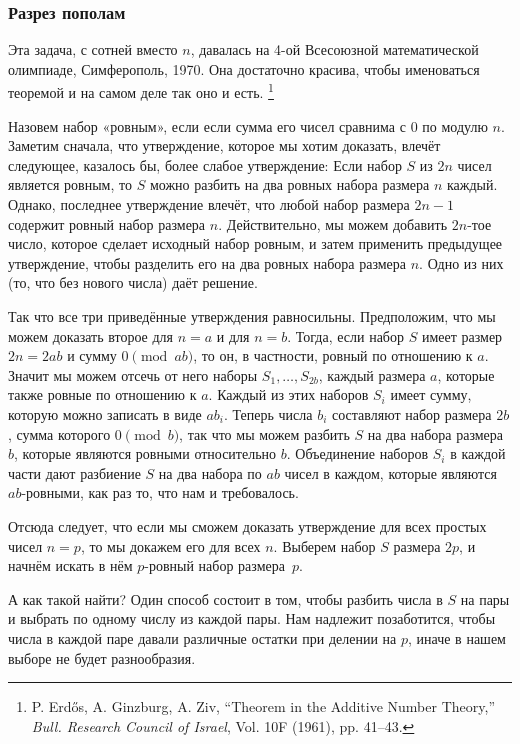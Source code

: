 \subsubsection*{Разрез пополам}

Эта задача, с сотней вместо $n$, давалась на 4-ой Всесоюзной математической олимпиаде, Симферополь, 1970.
Она достаточно красива, чтобы именоваться теоремой и на самом деле так оно и есть.%
\footnote{P. Erd\H{o}s, A. Ginzburg, A. Ziv, ``Theorem in the Additive Number Theory,'' \emph{Bull. Research Council of Israel}, Vol. 10F (1961), pp. 41--43.}

Назовем набор «ровным», если если сумма его чисел сравнима с $0$ по модулю $n$.
Заметим сначала, что утверждение, которое мы хотим доказать, влечёт следующее, казалось бы, более слабое утверждение: 
Если набор $S$ из $2n$ чисел является ровным, то $S$ можно разбить на два ровных набора размера $n$ каждый.
Однако, последнее утверждение влечёт, что любой набор размера $2n-1$ содержит ровный набор размера $n$.
Действительно, мы можем добавить $2n$-тое число, которое сделает исходный набор ровным, и затем применить предыдущее утверждение, чтобы разделить его на два ровных набора размера $n$. 
Одно из них (то, что без нового числа) даёт решение.

Так что все три приведённые утверждения равносильны.
Предположим, что мы можем доказать второе для $n = a$ и для $n = b$.
Тогда, если набор $S$ имеет размер $2n = 2ab$ и сумму $0 \pmod {ab}$, то он, в частности, ровный по отношению к $a$. 
Значит мы можем отсечь от него наборы $S_1,\dots,S_{2b}$, каждый размера $a$, которые также ровные по отношению к $a$.
Каждый из этих наборов $S_i$ имеет сумму, которую можно записать в виде $ab_i$.
Теперь числа $b_i$ составляют набор размера $2b$, сумма которого $0 \pmod b$, так что мы можем разбить $S$ на два набора размера $b$, которые являются ровными относительно $b$.
Объединение наборов $S_i$ в каждой части дают разбиение $S$ на два набора по $ab$ чисел в каждом, которые являются $ab$-ровными, как раз то, что нам и требовалось.

Отсюда следует, что если мы сможем доказать утверждение для всех простых чисел $n=p$, то мы докажем его для всех $n$.
Выберем набор $S$ размера $2p$, и начнём искать в нём $p$-ровный набор размера~$p$.

А как такой найти?
Один способ состоит в том, чтобы разбить числа в $S$ на пары и выбрать по одному числу из каждой пары.
Нам  надлежит позаботится, чтобы числа в каждой паре давали различные остатки при делении на $p$, иначе в нашем выборе не будет разнообразия.

